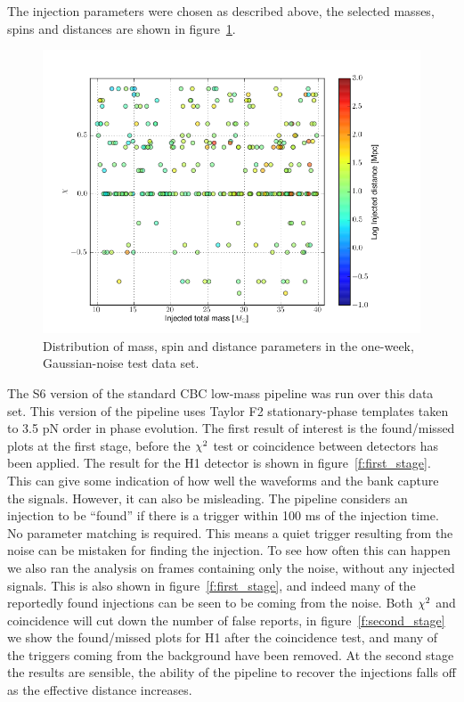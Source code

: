 The injection parameters were chosen as described above, the selected
masses, spins and distances are shown in
figure~\ref{f:ninja2_test_dataset}.

\begin{figure}
  \includegraphics[width=\linewidth]{figures/ninja2_results/ninja2_test_dataset.png}
  \caption[Parameters of the NINJA-2 test one-week data set]{
  \label{f:ninja2_test_dataset}
Distribution of mass, spin and distance parameters in the one-week,
Gaussian-noise test data set.
}
\end{figure}%


The S6 version of the standard CBC low-mass pipeline was run over this
data set.  This version of the pipeline uses Taylor F2
stationary-phase templates taken to 3.5 pN order in phase evolution.
The first result of interest is the found/missed plots at the first
stage, before the $\chi^2$ test or coincidence between detectors has
been applied.  The result for the H1 detector is shown in
figure~\ref{f:first_stage}.  This can give some indication of how
well the waveforms and the bank capture the signals.  However, it can
also be misleading.  The pipeline considers an injection to be
``found'' if there is a trigger within 100 ms of the injection time.
No parameter matching is required.  This means a quiet trigger
resulting from the noise can be mistaken for finding the injection.
To see how often this can happen we also ran the analysis on frames
containing only the noise, without any injected signals.  This is also
shown in figure~\ref{f:first_stage}, and indeed many of the
reportedly found injections can be seen to be coming from the noise.
Both $\chi^2$ and coincidence will cut down the number of false
reports, in figure~\ref{f:second_stage} we show the found/missed plots
for H1 after the coincidence test, and many of the triggers coming
from the background have been removed.  At the second stage the
results are sensible, the ability of the pipeline to recover the
injections falls off as the effective distance increases.



